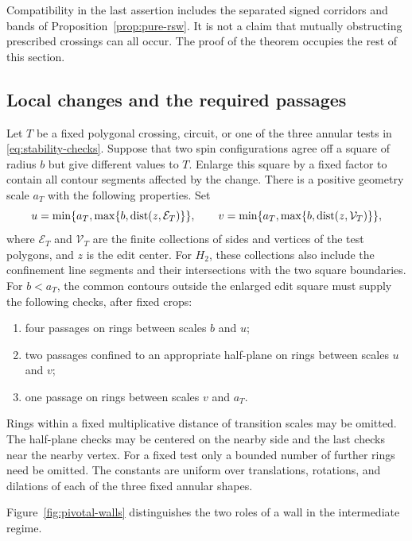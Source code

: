 Compatibility in the last assertion includes the separated signed
corridors and bands of Proposition~\ref{prop:pure-rsw}.  It is not a
claim that mutually obstructing prescribed crossings can all occur.
The proof of the theorem occupies the rest of this section.

\subsection{Local changes and the required passages}

\begin{lemma}
\label{lem:stability-pivotal}
Let $T$ be a fixed polygonal crossing, circuit, or one of the three
annular tests in \eqref{eq:stability-checks}.  Suppose that two spin
configurations agree off a square of radius $b$ but give different
values to $T$.  Enlarge this square by a fixed factor to contain all
contour segments affected by the change.  There is a positive
geometry scale $a_T$ with the following properties.  Set
\[
 u=\min\{a_T,\max\{b,\operatorname{dist}(z,\mathcal E_T)\}\},\qquad
 v=\min\{a_T,\max\{b,\operatorname{dist}(z,\mathcal V_T)\}\},
\]
where $\mathcal E_T$ and $\mathcal V_T$ are the finite collections
of sides and vertices of the test polygons, and $z$ is the edit
center.  For $H_2$, these collections also include the confinement
line segments and their intersections with the two square boundaries.
For $b<a_T$, the common contours outside the enlarged edit
square must supply the following checks, after fixed crops:
\begin{enumerate}[label=(\roman*)]
\item four passages on rings between scales $b$ and $u$;
\item two passages confined to an appropriate half-plane on rings
      between scales $u$ and $v$;
\item one passage on rings between scales $v$ and $a_T$.
\end{enumerate}
Rings within a fixed multiplicative distance of transition scales
may be omitted.  The half-plane checks may be centered on the
nearby side and the last checks near the nearby vertex.  For a
fixed test only a bounded number of further rings need be omitted.
The constants are uniform over translations, rotations, and
dilations of each of the three fixed annular shapes.
\end{lemma}

Figure~\ref{fig:pivotal-walls} distinguishes the two roles of a wall
in the intermediate regime.

